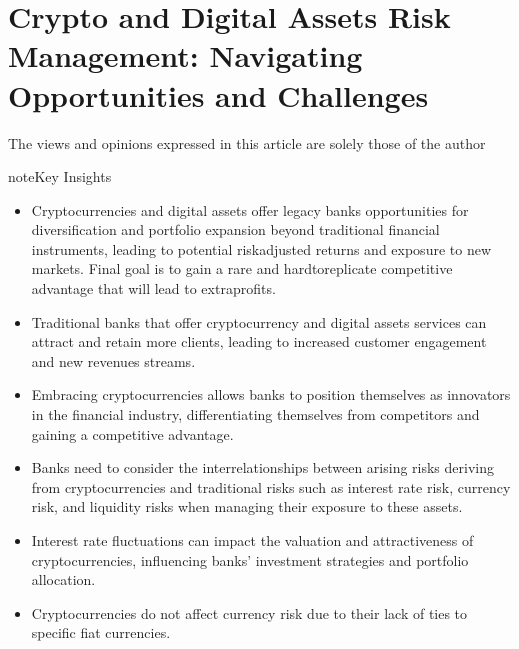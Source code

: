 \documentclass[letterpaper,10pt,english]{jupyterBook}
\begin{document}
\section{Crypto and Digital Assets Risk Management: Navigating Opportunities and Challenges}
\label{\detokenize{ARM/arm:crypto-and-digital-assets-risk-management-navigating-opportunities-and-challenges}}\label{\detokenize{ARM/arm::doc}}
\sphinxAtStartPar
{}

\sphinxAtStartPar
{} The views and opinions expressed in this article are solely those of the author

\begin{sphinxadmonition}{note}{Key Insights}
\begin{itemize}
\item {} 
\sphinxAtStartPar
Cryptocurrencies and digital assets offer legacy banks opportunities for diversification and portfolio expansion beyond traditional financial instruments, leading to potential risk\sphinxhyphen{}adjusted returns and exposure to new markets. Final goal is to gain a rare and hard\sphinxhyphen{}to\sphinxhyphen{}replicate competitive advantage that will lead to extra\sphinxhyphen{}profits.

\item {} 
\sphinxAtStartPar
Traditional banks that offer cryptocurrency and digital assets services can attract and retain more clients, leading to increased customer engagement and new revenues streams.

\item {} 
\sphinxAtStartPar
Embracing cryptocurrencies allows banks to position themselves as innovators in the financial industry, differentiating themselves from competitors and gaining a competitive advantage.

\item {} 
\sphinxAtStartPar
Banks need to consider the inter\sphinxhyphen{}relationships between arising risks deriving from crypto\sphinxhyphen{}currencies and traditional risks such as interest rate risk, currency risk, and liquidity risks when managing their exposure to these assets.

\item {} 
\sphinxAtStartPar
Interest rate fluctuations can impact the valuation and attractiveness of cryptocurrencies, influencing banks’ investment strategies and portfolio allocation.

\item {} 
\sphinxAtStartPar
Cryptocurrencies do not affect currency risk due to their lack of ties to specific fiat currencies.


\end{itemize}
\end{sphinxadmonition}
\end{document}
